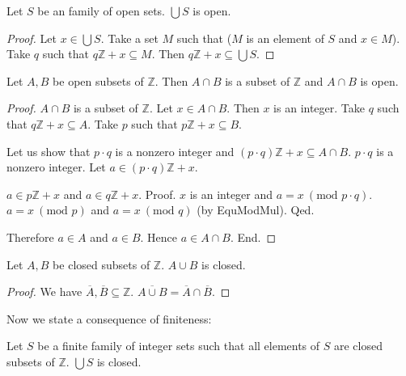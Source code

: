 \documentclass{article}
\renewcommand{\mod}{\text{mod }}
\newcommand{\Int}{\mathbb{Z}}
\begin{document}
  \begin{forthel}
    \begin{lemma}\label{UnionOpen}
      Let $S$ be an family of open sets.
      $\bigcup S$ is open.
    \end{lemma}
    \begin{proof}
      Let $x \in \bigcup S$.
      Take a set $M$ such that ($M$ is an element of $S$ and $x \in M$).
      Take $q$ such that $q \Int + x \subseteq M$.
      Then $q \Int + x \subseteq \bigcup S$.
    \end{proof}

    \begin{lemma}\label{InterOpen}
      Let $A,B$ be open subsets of $\Int$.
      Then $A \cap B$ is a subset of $\Int$ and $A \cap B$ is open.
    \end{lemma}
    \begin{proof}
      $A \cap B$ is a subset of $\Int$.
      Let $x \in A \cap B$.
      Then $x$ is an integer.
      Take $q$ such that $q \Int + x \subseteq A$.
      Take $p$ such that $p \Int + x \subseteq B$.

      Let us show that $p \cdot q$ is a nonzero integer and $(p \cdot q) \Int + x \subseteq A \cap B$.
        $p \cdot q$ is a nonzero integer.
        Let $a \in (p \cdot q) \Int + x$.

        $a \in p \Int + x$ and $a \in q \Int + x$. \newline
        Proof.
          $x$ is an integer and $a = x ~(\mod p \cdot q)$.
          $a = x ~(\mod p)$ and $a = x ~(\mod q)$ (by EquModMul).
        Qed.

        Therefore $a \in A$ and $a \in B$.
        Hence $a \in A \cap B$.
      End.
    \end{proof}

    \begin{lemma}\label{UnionClosed}
      Let $A,B$ be closed subsets of $\Int$.
      $A \cup B$ is closed.
    \end{lemma}
    \begin{proof}
      We have $\overline{A}, \overline{B} \subseteq \Int$.
      $\overline{A \cup B} = \overline{A} \cap \overline{B}$.
    \end{proof}
  \end{forthel}

  Now we state a consequence of finiteness:

  \begin{forthel}
    \begin{axiom}\label{UnionSClosed}
      Let $S$ be a finite family of integer sets such that all elements of $S$ are closed subsets of $\Int$.
      $\bigcup S$ is closed.
    \end{axiom}
  \end{forthel}
\end{document}
